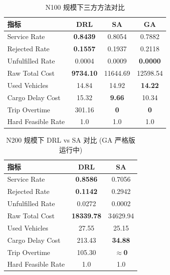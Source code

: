 \begin{table}[htbp]
\centering
\caption{N100 规模下三方方法对比}
\label{tab:comparison-n100}
\begin{tabular}{lccc}
\toprule
指标 & DRL & SA & GA \\
\midrule
Service Rate        & \textbf{0.8439} & 0.8054          & 0.7882          \\
Rejected Rate       & \textbf{0.1557} & 0.1937          & 0.2118          \\
Unfulfilled Rate    & 0.0004          & 0.0009          & \textbf{0.0000} \\
Raw Total Cost      & \textbf{9734.10}& 11644.69        & 12598.54        \\
Used Vehicles       & 14.84           & 14.92           & \textbf{14.22}  \\
Cargo Delay Cost    & 15.32           & \textbf{9.66}   & 10.34           \\
Trip Overtime       & 301.16          & \textbf{0}      & \textbf{0}      \\
Hard Feasible Rate  & 1.0             & 1.0             & 1.0             \\
\bottomrule
\end{tabular}
\end{table}

\begin{table}[htbp]
\centering
\caption{N200 规模下 DRL vs SA 对比 (GA 严格版运行中)}
\label{tab:comparison-n200}
\begin{tabular}{lcc}
\toprule
指标 & DRL & SA \\
\midrule
Service Rate        & \textbf{0.8586} & 0.7056          \\
Rejected Rate       & \textbf{0.1142} & 0.2942          \\
Unfulfilled Rate    & 0.0272          & 0.0002          \\
Raw Total Cost      & \textbf{18339.78}& 34629.94       \\
Used Vehicles       & 27.55           & 25.15           \\
Cargo Delay Cost    & 213.43          & \textbf{34.88}  \\
Trip Overtime       & 105.30          & \textbf{$\approx$0} \\
Hard Feasible Rate  & 1.0             & 1.0             \\
\bottomrule
\end{tabular}
\end{table}

